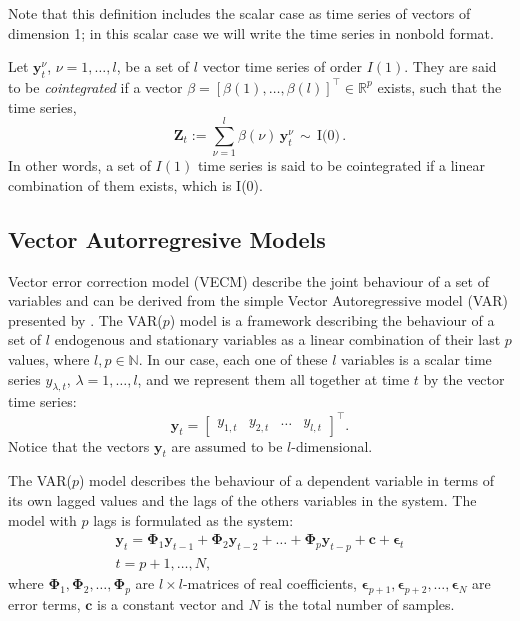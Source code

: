 Note that this definition includes the scalar case as time series of vectors of
dimension 1; in this scalar case we will write the time series in nonbold
format.

Let $\mathbf{y}_t^\nu$, $\nu=1,\dots,l$, be a set of $l$ vector time series of
order $I(1)$.  They are said to be {\em cointegrated\/} if a vector
$\beta=[\beta(1),\dots,\beta(l)]^\top \in \mathbb{R}^p$ exists, such that the
time series,
\begin{equation}
\mathbf{Z}_t:= 
\sum_{\nu=1}^l \beta(\nu)\,\mathbf{y}_t^\nu\,\sim\,\text{I(0)}\,.
\end{equation}
In other words, a set of $I(1)$ time series is said to be cointegrated if a
linear combination of them exists, which is I(0).


\subsection{Vector Autorregresive Models}\label{sec:varvec}

Vector error correction model (VECM) describe the joint behaviour of a set of
variables and can be derived from the simple Vector Autoregressive model (VAR)
presented by \cite{sims1980}.  The VAR($p$) model is a framework describing the
behaviour of a set of $l$ endogenous and stationary variables as a linear
combination of their last $p$ values, where $l,p\in\mathbb{N}$.  In our case,
each one of these $l$ variables is a scalar time series $y_{\lambda,t}$,
$\lambda=1,\dots,l$, and we represent them all together at time $t$ by the
vector time series:
\begin{equation}
\label{eq:variables}
\mathbf{y}_t = 
\begin{bmatrix} y_{1,t} & y_{2,t} & \dots & y_{l,t} \end{bmatrix}^\top.
\end{equation}
\noindent
Notice that the vectors $\mathbf{y}_t$ are assumed to be $l$-dimensional.

The VAR($p$) model describes the behaviour of a dependent variable in terms of
its own lagged values and the lags of the others variables in the system. The
model with $p$ lags is formulated as the system:
\begin{align}
\label{eq:var}
\mathbf{y}_t 
= \boldsymbol{\Phi}_1 \mathbf{y}_{t-1} +
  \boldsymbol{\Phi}_2 \mathbf{y}_{t-2} + \dots +
  \boldsymbol{\Phi}_p\mathbf{y}_{t-p} +
  \mathbf{c} + \boldsymbol{\epsilon}_t \nonumber \\
t=p+1,\dots,N,
\end{align}
\noindent where 
$\boldsymbol{\Phi}_1, \boldsymbol{\Phi}_2,\dots,\boldsymbol{\Phi}_p$
are $l\times l$-matrices of real coefficients,
$\boldsymbol{\epsilon}_{p+1},
 \boldsymbol{\epsilon}_{p+2}, \dots, \boldsymbol{\epsilon}_N$ 
are error terms, $\mathbf{c}$ is a constant vector and $N$ is the total
number of samples.

